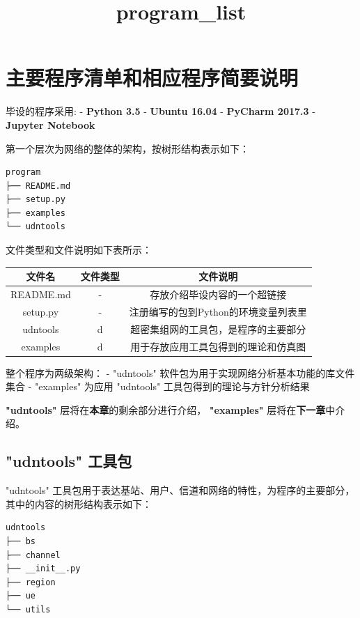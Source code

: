 \documentclass[11pt]{article}
\title{program\_list}
\begin{document}
    \maketitle




    \section{主要程序清单和相应程序简要说明}\label{ux4e3bux8981ux7a0bux5e8fux6e05ux5355ux548cux76f8ux5e94ux7a0bux5e8fux7b80ux8981ux8bf4ux660e}

毕设的程序采用: - \textbf{Python 3.5} - \textbf{Ubuntu 16.04} -
\textbf{PyCharm 2017.3} - \textbf{Jupyter Notebook}

第一个层次为网络的整体的架构，按树形结构表示如下：

\begin{verbatim}
program
├── README.md
├── setup.py
├── examples
└── udntools
\end{verbatim}

文件类型和文件说明如下表所示：

\begin{longtable}[c]{@{}ccc@{}}
\toprule
文件名 & 文件类型 & 文件说明\tabularnewline
\midrule
\endhead
README.md & - & 存放介绍毕设内容的一个超链接\tabularnewline
setup.py & - & 注册编写的包到Python的环境变量列表里\tabularnewline
udntools & d & 超密集组网的工具包，是程序的主要部分\tabularnewline
examples & d & 用于存放应用工具包得到的理论和仿真图\tabularnewline
\bottomrule
\end{longtable}

整个程序为两级架构： - "udntools"
软件包为用于实现网络分析基本功能的库文件集合 - "examples" 为应用
"udntools" 工具包得到的理论与方针分析结果

\textbf{"udntools"} 层将在\textbf{本章}的剩余部分进行介绍，
\textbf{"examples"} 层将在\textbf{下一章}中介绍。

\subsection{"udntools" 工具包}\label{udntools-ux5de5ux5177ux5305}

"udntools"
工具包用于表达基站、用户、信道和网络的特性，为程序的主要部分，其中的内容的树形结构表示如下：

\begin{verbatim}
udntools
├── bs
├── channel
├── __init__.py
├── region
├── ue
└── utils
\end{verbatim}
\end{document}

